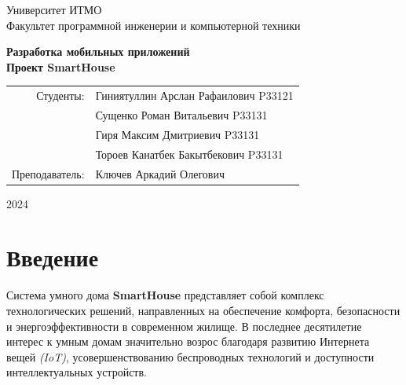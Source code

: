 \documentclass{article}
\begin{document}
\begin{titlepage}
    \begin{center}
        \begin{spacing}{1.4}
            \large{Университет ИТМО} \\
            \large{Факультет программной инженерии и компьютерной техники} \\
        \end{spacing}
        \vfill
        \textbf{
            \huge{Разработка мобильных приложений} \\
            \huge{Проект SmartHouse} \\
        }
    \end{center}
    \vfill
    \begin{center}
        \begin{tabular}{r l}
            Студенты:       & Гиниятуллин Арслан Рафаилович P33121 \\
                            & Сущенко Роман Витальевич P33131 \\
                            & Гиря Максим Дмитриевич P33131 \\
                            & Тороев Канатбек Бакытбекович P33131 \\
            Преподаватель:  & Ключев Аркадий Олегович \\
        \end{tabular}
    \end{center}
    \vfill
    \begin{center}
        \begin{large}
            2024
        \end{large}
    \end{center}
\end{titlepage}


\tableofcontents

\section{Введение}

Система умного дома \textbf{SmartHouse} представляет собой комплекс технологических решений, направленных на обеспечение комфорта, безопасности и энергоэффективности в современном жилище. В последнее десятилетие интерес к умным домам значительно возрос благодаря развитию Интернета вещей \textit{(IoT)}, усовершенствованию беспроводных технологий и доступности интеллектуальных устройств. 
\end{document}
